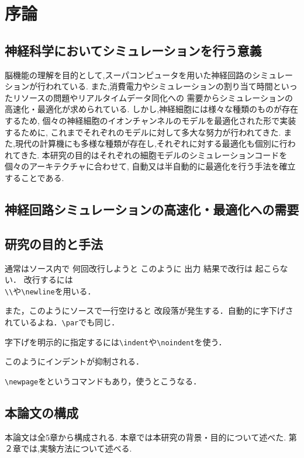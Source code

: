 \section{序論}
\subsection{神経科学においてシミュレーションを行う意義}
脳機能の理解を目的として,スーパコンピュータを用いた神経回路のシミュレーションが行われている.
また,消費電力やシミュレーションの割り当て時間といったリソースの問題やリアルタイムデータ同化への
需要からシミュレーションの高速化・最適化が求められている.
しかし,神経細胞には様々な種類のものが存在するため,
個々の神経細胞のイオンチャンネルのモデルを最適化された形で実装するために,
これまでそれぞれのモデルに対して多大な努力が行われてきた.
また,現代の計算機にも多様な種類が存在し,それぞれに対する最適化も個別に行われてきた.
本研究の目的はそれぞれの細胞モデルのシミュレーションコードを個々のアーキテクチャに合わせて,
自動又は半自動的に最適化を行う手法を確立することである.

\subsection{神経回路シミュレーションの高速化・最適化への需要}
\subsection{研究の目的と手法}
通常はソース内で
何回改行しようと
このように
出力
結果で改行は
起こらない．
改行するには\\
\verb+\+\verb+\+や\verb+\newline+を用いる．

また，このようにソースで一行空けると
改段落が発生する．自動的に字下げされているよね．\verb+\par+でも同じ．\par
字下げを明示的に指定するには\verb+\indent+や\verb+\noindent+を使う．

\noindent このようにインデントが抑制される．

\verb+\newpage+をというコマンドもあり，使うと{\newpage}こうなる．

\subsection{本論文の構成}
本論文は全5章から構成される.
本章では本研究の背景・目的について述べた.
第２章では,実験方法について述べる.

